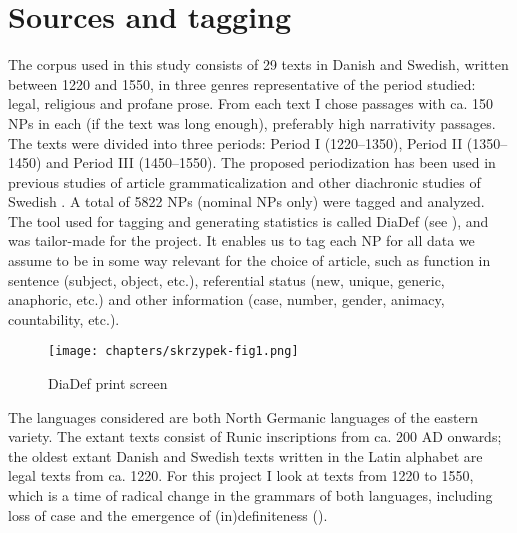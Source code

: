 \documentclass[output=paper]{langsci/langscibook}
\begin{document}
\section{Sources and tagging}\label{6sec:3}

The corpus used in this study consists of 29 texts in Danish and Swedish, written between 1220 and 1550, in three genres representative of the period studied: legal, religious and profane prose. From each text I chose passages with ca. 150 NPs in each (if the text was long enough), preferably high narrativity passages. The texts were divided into three periods: Period I (1220--1350), Period II (1350--1450) and Period III (1450--1550). The proposed periodization has been used in previous studies of article grammaticalization and other diachronic studies of Swedish \citep{delsing:12}. A total of 5822 NPs (nominal NPs only) were tagged and analyzed. The tool used for tagging and generating statistics is called DiaDef (see ), and was tailor-made for the project. It enables us to tag each NP for all data we assume to be in some way relevant for the choice of article, such as function in sentence (subject, object, etc.), referential status (new, unique, generic, anaphoric, etc.) and other information (case, number, gender, animacy, countability, etc.).

\begin{figure}[t]
\texttt{[image: chapters/skrzypek-fig1.png]}
\caption{DiaDef print screen}\label{6fig:1}
\end{figure}


The languages considered are both North Germanic languages of the eastern variety. The extant texts consist of Runic inscriptions from ca. 200 AD onwards; the oldest extant Danish and Swedish texts written in the Latin alphabet are legal texts from ca. 1220. For this project I look at texts from 1220 to 1550, which is a time of radical change in the grammars of both languages, including loss of case and the emergence of (in)definiteness ().
\end{document}

